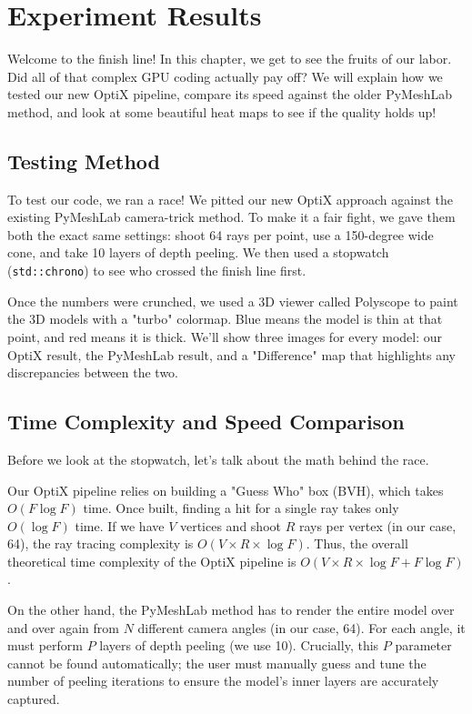 \chapter{Experiment Results}

Welcome to the finish line! In this chapter, we get to see the fruits of our labor. Did all of that complex GPU coding actually pay off? We will explain how we tested our new OptiX pipeline, compare its speed against the older PyMeshLab method, and look at some beautiful heat maps to see if the quality holds up!

\section{Testing Method}

To test our code, we ran a race! We pitted our new OptiX approach against the existing PyMeshLab camera-trick method. To make it a fair fight, we gave them both the exact same settings: shoot 64 rays per point, use a 150-degree wide cone, and take 10 layers of depth peeling. We then used a stopwatch (\texttt{std::chrono}) to see who crossed the finish line first. 

Once the numbers were crunched, we used a 3D viewer called Polyscope to paint the 3D models with a "turbo" colormap. Blue means the model is thin at that point, and red means it is thick. We'll show three images for every model: our OptiX result, the PyMeshLab result, and a "Difference" map that highlights any discrepancies between the two.

\section{Time Complexity and Speed Comparison}

Before we look at the stopwatch, let's talk about the math behind the race. 

Our OptiX pipeline relies on building a "Guess Who" box (BVH), which takes $O(F \log F)$ time. Once built, finding a hit for a single ray takes only $O(\log F)$ time. If we have $V$ vertices and shoot $R$ rays per vertex (in our case, 64), the ray tracing complexity is $O(V \times R \times \log F)$. Thus, the overall theoretical time complexity of the OptiX pipeline is $O(V \times R \times \log F + F \log F)$.

On the other hand, the PyMeshLab method has to render the entire model over and over again from $N$ different camera angles (in our case, 64). For each angle, it must perform $P$ layers of depth peeling (we use 10). Crucially, this $P$ parameter cannot be found automatically; the user must manually guess and tune the number of peeling iterations to ensure the model's inner layers are accurately captured.


